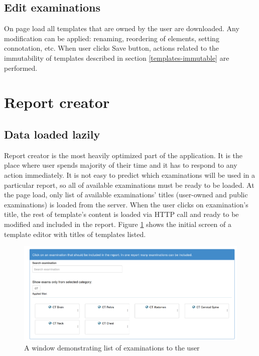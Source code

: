 \documentclass[12pt, twoside, openany]{report}
\theoremstyle{definition}
\begin{document}
\subsection{Edit examinations}
On page load all templates that are owned by the user are downloaded. Any modification can be applied: renaming, reordering of elements, setting connotation, etc. When user clicks Save button, actions related to the immutability of templates described in section \ref{templates-immutable} are performed.


\section{Report creator}

\subsection{Data loaded lazily}
Report creator is the most heavily optimized part of the application. It is the place where user spends majority of their time and it has to respond to any action immediately. It is not easy to predict which examinations will be used in a particular report, so all of available examinations must be ready to be loaded. At the page load, only list of available examinations' titles (user-owned and public examinations) is loaded from the server. When the user clicks on examination's title, the rest of template's content is loaded via HTTP call and ready to be modified and included in the report. Figure \ref{fig:examination-list} shows the initial screen of a template editor with titles of templates listed.

\begin{figure}
	\centering
	\includegraphics[width=0.9\linewidth]{examination-list}
	\caption{A window demonstrating list of examinations to the user\protect\footnotemark[3]
		\label{fig:examination-list}
	}
\end{figure}
\end{document}
